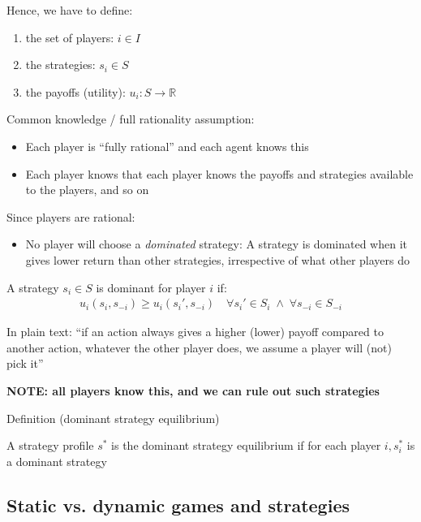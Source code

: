 \documentclass[10pt]{article}
\begin{document}
\hfill 

Hence, we have to define:
\begin{enumerate}
    \item the set of players: $i \in I$
    \item the strategies: $s_i \in S$
    \item the payoffs (utility): $u_i: S \to \mathbb{R}$
\end{enumerate}

\hfill 

Common knowledge / full rationality assumption: 
\begin{itemize}
    \item Each player is ``fully rational'' and each agent knows this
    \item Each player knows that each player knows the payoffs and strategies available to the players, and so on
\end{itemize}

\hfill 

Since players are rational:
\begin{itemize}
    \item No player will choose a \textit{dominated} strategy: A strategy is dominated when it gives lower return than other strategies, irrespective of what other players do
\end{itemize}

\hfill  

A strategy $s_i \in S$ is dominant for player $i$ if:
\begin{align*}
    u_i(s_i, s_{-i}) \geq u_i(s_i', s_{-i}) \quad\forall s_i' \in S_i \;\land\; \forall s_{-i} \in S_{-i}
\end{align*}

In plain text: ``if an action always gives a higher (lower) payoff compared to another action, whatever the other player does, we assume a player will (not) pick it''

\hfill 

\textbf{NOTE: all players know this, and we can rule out such strategies}

\hfill 

Definition (dominant strategy equilibrium)

A strategy profile $s^*$ is the dominant strategy equilibrium if for each player $i, s_i^*$ is a dominant strategy

\newpage

\subsection{Static vs. dynamic games and strategies}
\end{document}
